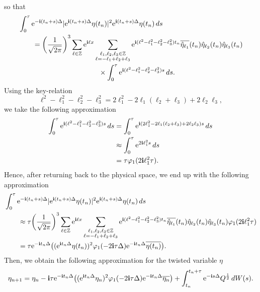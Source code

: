 \documentclass[a4paper]{amsart}
\begin{document}
so that
\begin{align}
    &\int_0^\tau {\rm e}^{-{\bf i}(t_n+s)\Delta}|{\rm e}^{{\bf i}(t_n+s)\Delta}\eta(t_n)|^2 {\rm e}^{{\bf i}(t_n+s)\Delta}\eta(t_n)\,ds\notag \\
    &\qquad = \bigg(\frac{1}{\sqrt{2\pi}}\bigg)^{3} \sum_{\ell\in\mathbb{Z}} {\rm e}^{{\bf i}\ell x} \sum_{\substack{\ell_1,\ell_2,\ell_3\in\mathbb{Z}\\ \ell=-\ell_1+\ell_2+\ell_3}}
    {\rm e}^{{\bf i}(\ell^2-\ell_1^2-\ell_2^2-\ell_3^2) t_n}\overline{\hat{\eta}_{\ell_1}}(t_n)
\hat{\eta}_{\ell_2}(t_n)\hat{\eta}_{\ell_3}(t_n)\notag \\
&\hspace{4cm}\times \int_0^\tau {\rm e}^{{\bf i}(\ell^2-\ell_1^2-\ell_2^2-\ell_3^2) s}\,ds. \label{four_met}
\end{align}
Using the key-relation
$$
\ell^2-\ell_1^2-\ell_2^2-\ell_3^2=2\ell_1^2-2\ell_1(\ell_2+\ell_3)+2\ell_2\ell_3,
$$
we take the following approximation
\begin{align*}
    \int_0^\tau {\rm e}^{{\bf i}(\ell^2-\ell_1^2-\ell_2^2-\ell_3^2) s}\,ds &= \int_0^\tau {\rm e}^{{\bf i}( 2\ell_1^2-2\ell_1(\ell_2+\ell_3)+2\ell_2\ell_3) s}\,ds\\
    &\approx  \int_0^\tau {\rm e}^{2{\bf i}\ell_1^2 s}\,ds\\
    &= \tau \varphi_1(2{\bf i}\ell_1^2 \tau).
\end{align*}
Hence, after returning back to the physical space, we end up with the following approximation
\begin{align*}
    &\int_0^\tau {\rm e}^{-{\bf i}(t_n+s)\Delta}|{\rm e}^{{\bf i}(t_n+s)\Delta}\eta(t_n)|^2 {\rm e}^{{\bf i}(t_n+s)\Delta}\eta(t_n)\,ds\\
    &\qquad \approx \tau \bigg(\frac{1}{\sqrt{2\pi}}\bigg)^{3} \sum_{\ell\in\mathbb{Z}} {\rm e}^{{\bf i}\ell x} \sum_{\substack{\ell_1,\ell_2,\ell_3\in\mathbb{Z}\\ \ell=-\ell_1+\ell_2+\ell_3}}
    {\rm e}^{{\bf i}(\ell^2-\ell_1^2-\ell_2^2-\ell_3^2) t_n}\overline{\hat{\eta}_{\ell_1}}(t_n)
\hat{\eta}_{\ell_2}(t_n)\hat{\eta}_{\ell_3}(t_n)  \varphi_1(2{\bf i}\ell_1^2 \tau)\\
&\qquad =\tau {\rm e}^{-{\bf i}t_n\Delta}\big(({\rm e}^{{\bf i}t_n\Delta}\eta(t_n))^2\varphi_1(-2{\bf i}\tau\Delta){\rm e}^{{-\bf i}t_n\Delta}\overline{\eta(t_n)}\big).
\end{align*}
Then, we obtain the following approximation for the twisted variable $\eta$
$$
\eta_{n+1}=\eta_n-{\bf i}\tau {\rm e}^{-{\bf i}t_n\Delta}\big(({\rm e}^{{\bf i}t_n\Delta}\eta_n)^2\varphi_1(-2{\bf i}\tau\Delta){\rm e}^{{-\bf i}t_n\Delta}\overline{\eta_n}\big)
+\int_{t_n}^{t_n+\tau} {\rm e}^{-{\bf i}s\Delta} Q^{\frac{1}{2}}\,dW(s).
$$
\end{document}

